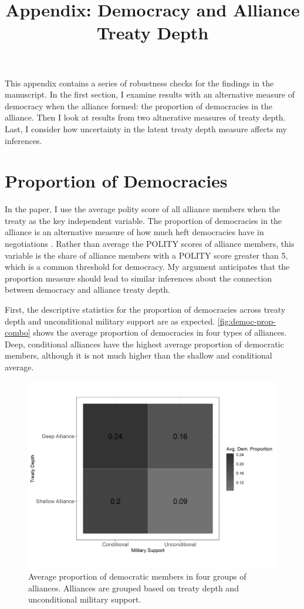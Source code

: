 \documentclass[12pt]{article}
\title{\textbf{Appendix: Democracy and Alliance Treaty Depth}}
\author{}
\date{}
\begin{document}
\maketitle 

\doublespace 

This appendix contains a series of robustness checks for the findings in the manuscript. 
In the first section, I examine results with an alternative measure of democracy when the alliance formed: the proportion of democracies in the alliance. 
Then I look at results from two altnerative measures of treaty depth.  
Last, I consider how uncertainty in the latent treaty depth measure affects my inferences. 


\section{Proportion of Democracies}


In the paper, I use the average polity score of all alliance members when the treaty as the key independent variable. 
The proportion of democracies in the alliance is an alternative measure of how much heft democracies have in negotiations \cite{Chibaetal2015}.  
Rather than average the POLITY scores of alliance members, this variable is the share of alliance members with a POLITY score greater than 5, which is a common threshold for democracy. 
My argument anticipates that the proportion measure should lead to similar inferences about the connection between democracy and alliance treaty depth.


First, the descriptive statistics for the proportion of democracies across treaty depth and unconditional military support are as expected. 
\autoref{fig:democ-prop-combo} shows the average proportion of democracies in four types of alliances. 
Deep, conditional alliances have the highest average proportion of democratic members, although it is not much higher than the shallow and conditional average.  


\begin{figure}
\includegraphics[width=.95\textwidth]{democ-prop-combo.png}  
\caption{Average proportion of democratic members in four groups of alliances. Alliances are grouped based on treaty depth and unconditional military support.}
\label{fig:democ-prop-combo}
\end{figure}
\end{document}
